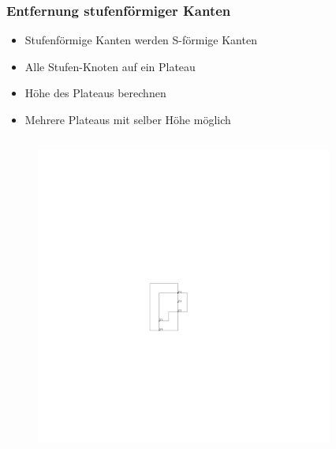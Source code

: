 \documentclass{beamer}
\begin{document}
\begin{frame}
  \frametitle{Entfernung stufenförmiger Kanten}
  \begin{itemize}[<+->]
    \item Stufenförmige Kanten werden S-förmige Kanten
    \item Alle Stufen-Knoten auf ein Plateau
    \item Höhe des Plateaus berechnen
    \item Mehrere Plateaus mit selber Höhe möglich
  \end{itemize}
\begin{columns}[c]
\begin{column}{5cm}
\begin{figure}[h]
  \centering
  \includegraphics[scale=.7]{exampleA/orthogonalNocompress}
  \label{fig:exampleAorthogonalNocompress}
\end{figure}
\end{column}
\begin{column}{5cm}
\begin{figure}[h]
  \centering

\end{figure}
\end{column}
\end{columns}
\end{frame}
\end{document}
